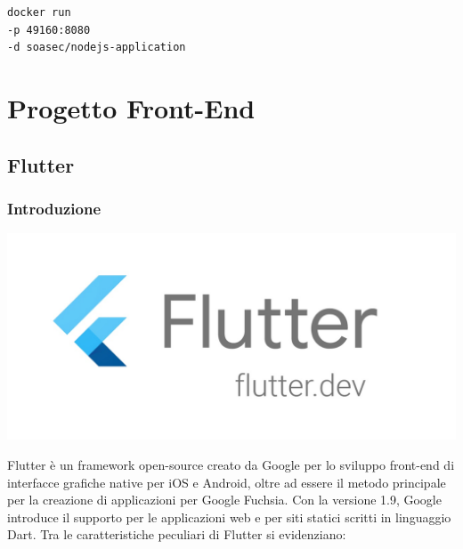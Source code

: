 \documentclass[twoside]{report}
\begin{document}
\begin{listing}[h!]
\begin{verbatim}
docker run 
-p 49160:8080 
-d soasec/nodejs-application
\end{verbatim}
\end{listing}
\FloatBarrier

\chapter{Progetto Front-End}
\thispagestyle{empty} 
\section{Flutter}

\graphicspath{ {../progetto/images/flutter/} }

\subsection{Introduzione}

\begin{minipage}{\linewidth}
    \vspace{2mm}
    \centering
    \includegraphics[width= \linewidth]{icon.png}
    \vspace{2mm}
\end{minipage}

Flutter è un framework open-source creato da Google per lo sviluppo front-end di interfacce grafiche native per iOS e Android, oltre ad essere il metodo principale per la creazione di applicazioni per Google Fuchsia.
\bigbreak
Con la versione 1.9, Google introduce il supporto per le applicazioni web e per siti statici scritti in linguaggio Dart. 
\bigbreak
Tra le caratteristiche peculiari di Flutter si evidenziano:
\end{document}
